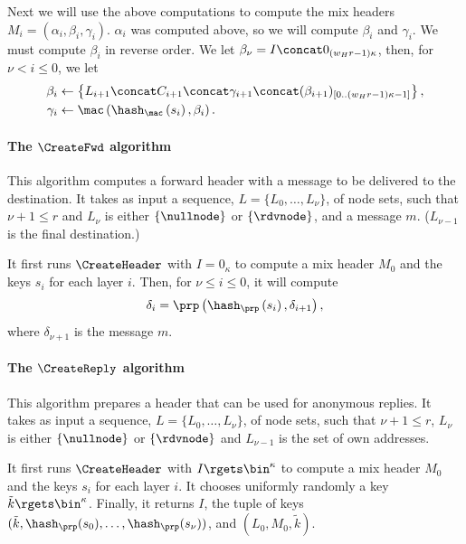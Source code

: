 Next we will use the above computations to compute the mix headers \(M_i = 
  (\alpha_i, \beta_i, \gamma_i)\).
\(\alpha_i\) was computed above, so we will compute \(\beta_i\) and 
\(\gamma_i\).
We must compute \(\beta_i\) in reverse order.
We let \(\beta_{\nu} = I\concat 0_{(w_H r-1)\kappa}\), then, for \(\nu < i\leq 
  0\), we let
\begin{align*}
  \beta_i &\gets \left\{L_{i+1}\concat C_{i+1}\concat \gamma_{i+1}\concat 
    (\beta_{i+1})_{[0..(w_H r-1)\kappa-1]}\right\}, \\
  \gamma_i &\gets \mac\left( \hash_\mac\left(s_i\right), \beta_i \right).
\end{align*}

\paragraph*{The \(\CreateFwd\) algorithm}

This algorithm computes a forward header with a message to be delivered to the 
destination.
It takes as input a sequence, \(L = \{L_0, \dotsc, L_\nu\}\), of node sets, 
such that \(\nu+1\leq r\) and \(L_\nu\) is either \(\{\nullnode\}\) or 
\(\{\rdvnode\}\), and a message \(m\).
(\Ie \(L_{\nu-1}\) is the final destination.)

It first runs \(\CreateHeader\) with \(I = 0_\kappa\) to compute a mix header 
\(M_0\) and the keys \(s_i\) for each layer \(i\).
Then, for \(\nu\leq i\leq 0\), it will compute
\begin{equation*}
  \delta_i = \prp\left(
    \hash_\prp\left(s_i\right),
    \delta_{i+1}\right),
\end{equation*}
where \(\delta_{\nu+1}\) is the message \(m\).

\paragraph*{The \(\CreateReply\) algorithm}

This algorithm prepares a header that can be used for anonymous replies.
It takes as input a sequence, \(L = \{L_0, \dotsc, L_\nu\}\), of node sets, 
such that \(\nu+1\leq r\), \(L_\nu\) is either \(\{\nullnode\}\) or 
\(\{\rdvnode\}\) and \(L_{\nu-1}\) is the set of own addresses.

It first runs \(\CreateHeader\) with \(I\rgets \bin^\kappa\) to compute a mix 
header \(M_0\) and the keys \(s_i\) for each layer \(i\).
It chooses uniformly randomly a key \(\tilde k\rgets \bin^\kappa\).
Finally, it returns
\(I\),
the tuple of keys \((\tilde k, \hash_\prp(s_0), \dotsc, \hash_\prp(s_\nu))\),
and \((L_0, M_0, \tilde k)\).

